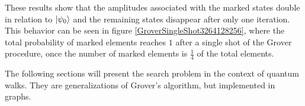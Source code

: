 \documentclass[../../dissertation.tex]{subfiles}
\begin{document}
These results show that the amplitudes associated with the marked states double
in relation to $\ket{\psi_0}$ and the remaining states disappear after only one
iteration. This behavior can be seen in figure
\ref{GroverSingleShot3264128256}, where the total probability of marked
elements reaches $1$ after a single shot of the Grover procedure, once the
number of marked elements is $\frac{1}{4}$ of the total elements.\par 
The following sections will present the search problem in the context of quantum
walks. They are generalizations of Grover's algorithm, but implemented in graphs.  
\end{document}
